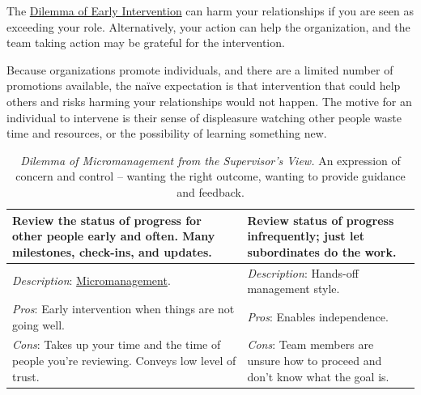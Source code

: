 The \hyperref[table:dilemma-personal-early-intervention]{Dilemma of Early Intervention} can harm your relationships if you are seen as exceeding your role. Alternatively, your action can help the organization, and the team taking  action may be grateful for the intervention. 

Because organizations promote individuals, and there are a limited number of promotions available, the na\"ive expectation is that intervention that could help others and risks harming your relationships would not happen. The motive for an individual to intervene is their sense of displeasure watching other people waste time and resources, or the possibility of learning something new.


\begin{center}
\begin{table}[H] %
\begin{tabular}{ | m{\dilemmatablewidth}| m{\dilemmatablewidth} | } 
  \hline
  \textbf{Review the status of progress for other people early and often. Many milestones, check-ins, and updates.} &
  \textbf{Review status of progress infrequently; just let subordinates do the work.} \\
  \hline
  \textit{Description}: \href{https://en.wikipedia.org/wiki/Micromanagement}{Micromanagement}. 
  \index{Wikipedia!micromanagement@\href{https://en.wikipedia.org/wiki/Micromanagement}{micromanagement}}
  & 
  \textit{Description}: Hands-off management style. \\
  \hline
  \textit{Pros}: Early intervention when things are not going well. & 
  \textit{Pros}: Enables independence. \\
  \hline
  \textit{Cons}: Takes up your time and the time of people you're reviewing. Conveys low level of trust. & 
  \textit{Cons}: Team members are unsure how to proceed and don't know what the goal is. \\
  \hline
\end{tabular}
\caption{\textit{Dilemma of Micromanagement from the Supervisor's View.}
An expression of concern and control -- wanting the right outcome, wanting to provide guidance and feedback. 
}
\label{table:dilemma-personal-manager-micromanaging}
\end{table}
\end{center}

